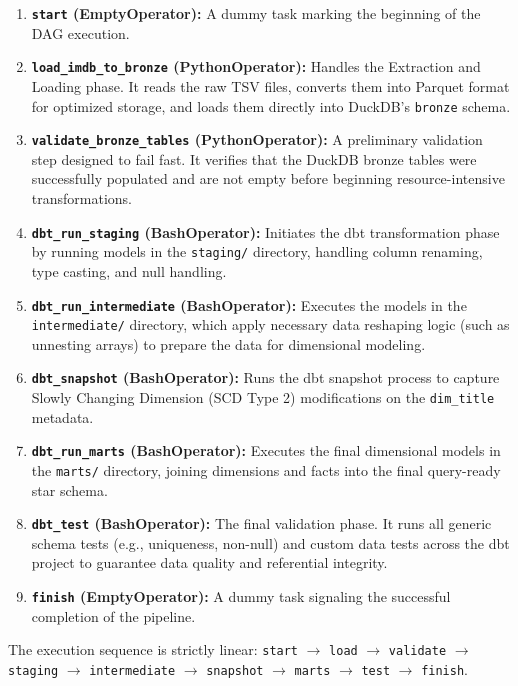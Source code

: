 \documentclass[runningheads]{llncs}
\begin{document}
\begin{enumerate}
    \item \textbf{\texttt{start} (EmptyOperator):} A dummy task marking the beginning of the DAG execution.
    \item \textbf{\texttt{load\_imdb\_to\_bronze} (PythonOperator):} Handles the Extraction and Loading phase. It reads the raw TSV files, converts them into Parquet format for optimized storage, and loads them directly into DuckDB's \texttt{bronze} schema.
    \item \textbf{\texttt{validate\_bronze\_tables} (PythonOperator):} A preliminary validation step designed to fail fast. It verifies that the DuckDB bronze tables were successfully populated and are not empty before beginning resource-intensive transformations.
    \item \textbf{\texttt{dbt\_run\_staging} (BashOperator):} Initiates the dbt transformation phase by running models in the \texttt{staging/} directory, handling column renaming, type casting, and null handling.
    \item \textbf{\texttt{dbt\_run\_intermediate} (BashOperator):} Executes the models in the \texttt{intermediate/} directory, which apply necessary data reshaping logic (such as unnesting arrays) to prepare the data for dimensional modeling.
    \item \textbf{\texttt{dbt\_snapshot} (BashOperator):} Runs the dbt snapshot process to capture Slowly Changing Dimension (SCD Type 2) modifications on the \texttt{dim\_title} metadata.
    \item \textbf{\texttt{dbt\_run\_marts} (BashOperator):} Executes the final dimensional models in the \texttt{marts/} directory, joining dimensions and facts into the final query-ready star schema.
    \item \textbf{\texttt{dbt\_test} (BashOperator):} The final validation phase. It runs all generic schema tests (e.g., uniqueness, non-null) and custom data tests across the dbt project to guarantee data quality and referential integrity.
    \item \textbf{\texttt{finish} (EmptyOperator):} A dummy task signaling the successful completion of the pipeline.
\end{enumerate}

The execution sequence is strictly linear: \texttt{start} $\rightarrow$ \texttt{load} $\rightarrow$ \texttt{validate} $\rightarrow$ \texttt{staging} $\rightarrow$ \texttt{intermediate} $\rightarrow$ \texttt{snapshot} $\rightarrow$ \texttt{marts} $\rightarrow$ \texttt{test} $\rightarrow$ \texttt{finish}.
\end{document}
